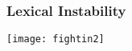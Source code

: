 \documentclass[11pt,compress,professionalfonts]{beamer}
\newcommand{\ita}{\begin{itemize}}
\newcommand{\itm}{\item[]}
\newcommand{\itz}{\end{itemize}}
\begin{document}
\begin{frame}[t,fragile]\frametitle{Lexical Instability}

\centerline{\texttt{[image: fightin2]}}




%
%
%
%
%
%
%
%
%
%
%
%
%
%
%
%
%
%
%
%
%
%
%
%
%
%
%
%
%
%
%
%
%
%
%
%
%
%
%
%

\end{frame}
\end{document}
